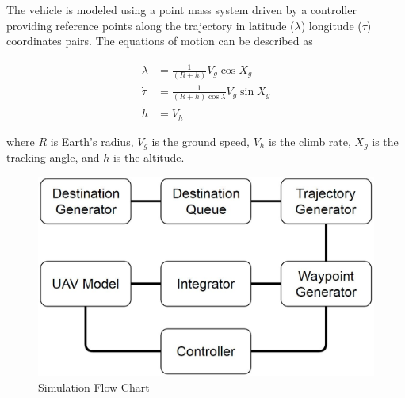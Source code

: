 The vehicle is modeled using a point mass system driven by a controller providing reference points along the trajectory in latitude ($\lambda$) longitude ($\tau$) coordinates pairs. The equations of motion can be described as 


\begin{align}
\dot{\lambda} &= \frac{1}{(R+h)}V_{g}\cos{\textit{X}_{g}} \\
\dot{\tau} &= \frac{1}{(R+h)\cos{\lambda}}V_{g}\sin{\textit{X}_{g}} \\
\dot{h} &= V_{h}
\end{align}

\vspace{5mm}
where $R$ is Earth's radius, $V_{g}$ is the ground speed, $V_{h}$ is the climb rate, $\textit{X}_{g}$ is the tracking angle, and $h$ is the altitude.

\vspace{10mm}

\begin{figure}
\includegraphics[width=1\linewidth]{images/TopLevelDesign.JPG}
\caption{Simulation Flow Chart}
\end{figure}


